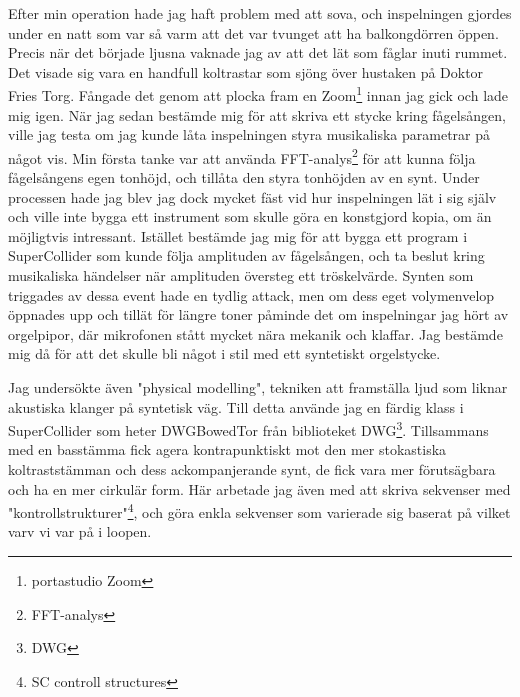 \documentclass{article}
\begin{document}
	Efter min operation hade jag haft problem med att sova, och
	inspelningen gjordes under en natt som var så varm att det var tvunget att ha balkongdörren öppen. Precis
	när det började ljusna vaknade jag av att det lät som fåglar inuti rummet. Det visade sig vara en handfull
	koltrastar som sjöng över hustaken på Doktor Fries Torg. Fångade det genom att plocka fram en
	Zoom\footnote{portastudio Zoom} innan jag gick och lade mig igen. 
		När jag sedan bestämde mig för att skriva ett stycke kring fågelsången, ville jag testa om jag kunde
	låta inspelningen styra musikaliska parametrar på något vis. Min första tanke var att använda
	FFT-analys\footnote{FFT-analys} för att kunna följa fågelsångens egen tonhöjd, och tillåta den styra
	tonhöjden av en synt. Under processen hade jag blev jag dock mycket fäst vid hur inspelningen lät i sig
	själv och ville inte bygga ett instrument som skulle göra en konstgjord kopia, om än möjligtvis
	intressant. Istället bestämde jag mig för att bygga ett program i SuperCollider som kunde följa amplituden
	av fågelsången, och ta beslut kring musikaliska händelser när amplituden översteg ett tröskelvärde. Synten
	som triggades av dessa event hade en tydlig attack, men om dess eget volymenvelop öppnades upp och tillät
	för längre toner påminde det om inspelningar jag hört av orgelpipor, där mikrofonen stått mycket nära
	mekanik och klaffar. Jag bestämde mig då för att det skulle bli något i stil med ett syntetiskt
	orgelstycke. 


	Jag undersökte även "physical modelling", tekniken att framställa ljud som liknar akustiska klanger på
	syntetisk väg. Till detta använde jag en färdig klass i SuperCollider som heter DWGBowedTor från
	biblioteket DWG\footnote{DWG}. Tillsammans med en basstämma fick agera kontrapunktiskt mot den mer
	stokastiska koltraststämman och dess ackompanjerande synt, de fick vara mer förutsägbara och ha en mer
	cirkulär form. Här arbetade jag även med att skriva sekvenser med "kontrollstrukturer"\footnote{SC
	controll structures}, och göra enkla sekvenser som varierade sig baserat på vilket varv vi var på i
	loopen. 
	\pagebreak
\end{document}
